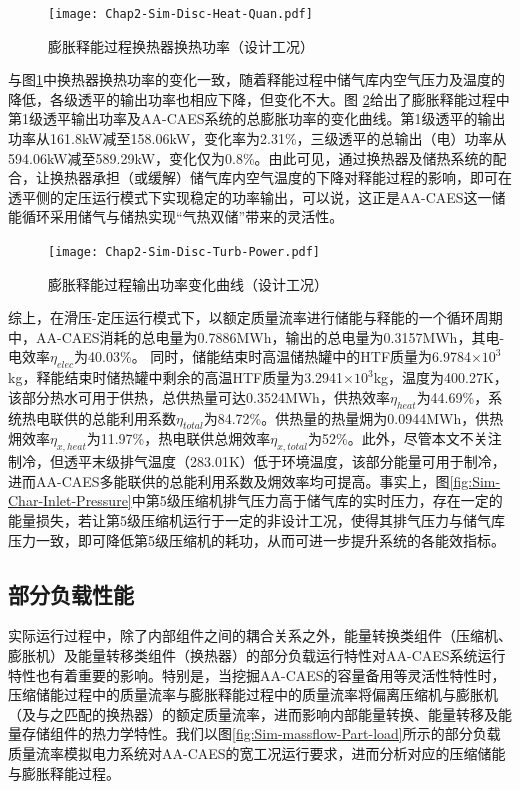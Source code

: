 \begin{figure}[H] %
  \centering
  \texttt{[image: Chap2-Sim-Disc-Heat-Quan.pdf]}
  \caption{膨胀释能过程换热器换热功率（设计工况）}
  \label{fig:Sim-Disc-Heat-Quan}
\end{figure}

与图\ref{fig:Sim-Disc-Heat-Quan}中换热器换热功率的变化一致，随着释能过程中储气库内空气压力及温度的降低，各级透平的输出功率也相应下降，但变化不大。图
\ref{fig:Sim-Disc-Turb-Power}给出了膨胀释能过程中第1级透平输出功率及AA-CAES系统的总膨胀功率的变化曲线。第1级透平的输出功率从161.8kW减至158.06kW，变化率为2.31\%，三级透平的总输出（电）功率从594.06kW减至589.29kW，变化仅为0.8\%。由此可见，通过换热器及储热系统的配合，让换热器承担（或缓解）储气库内空气温度的下降对释能过程的影响，即可在透平侧的定压运行模式下实现稳定的功率输出，可以说，这正是AA-CAES这一储能循环采用储气与储热实现“气热双储”带来的灵活性。

\begin{figure}[H] %
  \centering
  \texttt{[image: Chap2-Sim-Disc-Turb-Power.pdf]}
  \caption{膨胀释能过程输出功率变化曲线（设计工况）}
  \label{fig:Sim-Disc-Turb-Power}
\end{figure}

综上，在滑压-定压运行模式下，以额定质量流率进行储能与释能的一个循环周期中，AA-CAES消耗的总电量为0.7886MWh，输出的总电量为0.3157MWh，其电-电效率$\eta_{elec}$为40.03\%。 同时，储能结束时高温储热罐中的HTF质量为6.9784$\times 10^3$kg，释能结束时储热罐中剩余的高温HTF质量为3.2941$\times10^3$kg，温度为400.27K，该部分热水可用于供热，总供热量可达0.3524MWh，供热效率$\eta_{heat}$为44.69\%，系统热电联供的总能利用系数$\eta_{total}$为84.72\%。供热量的热量㶲为0.0944MWh，供热㶲效率$\eta_{x,heat}$为11.97\%，热电联供总㶲效率$\eta_{x,total}$为52\%。此外，尽管本文不关注制冷，但透平末级排气温度（283.01K）低于环境温度，该部分能量可用于制冷，进而AA-CAES多能联供的总能利用系数及㶲效率均可提高。事实上，图\ref{fig:Sim-Char-Inlet-Pressure}中第5级压缩机排气压力高于储气库的实时压力，存在一定的能量损失，若让第5级压缩机运行于一定的非设计工况，使得其排气压力与储气库压力一致，即可降低第5级压缩机的耗功，从而可进一步提升系统的各能效指标。

\subsection{部分负载性能}
\label{sec:chap2-model-valid-TICC}
实际运行过程中，除了内部组件之间的耦合关系之外，能量转换类组件（压缩机、膨胀机）及能量转移类组件（换热器）的部分负载运行特性对AA-CAES系统运行特性也有着重要的影响。特别是，当挖掘AA-CAES的容量备用等灵活性特性时，压缩储能过程中的质量流率与膨胀释能过程中的质量流率将偏离压缩机与膨胀机（及与之匹配的换热器）的额定质量流率，进而影响内部能量转换、能量转移及能量存储组件的热力学特性。我们以图\ref{fig:Sim-massflow-Part-load}所示的部分负载质量流率模拟电力系统对AA-CAES的宽工况运行要求，进而分析对应的压缩储能与膨胀释能过程。

